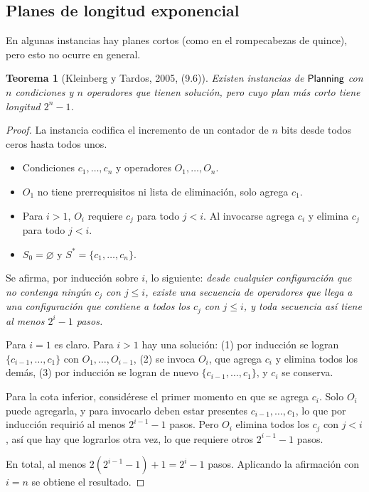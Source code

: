 \documentclass[11pt,letterpaper]{article}
\theoremstyle{plain}
\newtheorem{teorema}{Teorema}[section]
\theoremstyle{definition}
\theoremstyle{remark}
\newcommand{\vacio}{\varnothing}
\newcommand{\nombreMat}[1]{\ensuremath{\text{\fontencoding{OT1}\fontfamily{cmss}\upshape\selectfont #1}}}
\newcommand{\PLANNING}{\nombreMat{Planning}}
\begin{document}
\subsection{Planes de longitud exponencial}

En algunas instancias hay planes cortos (como en el
rompecabezas de quince), pero esto no ocurre en general.

\begin{teorema}[Kleinberg y Tardos, 2005, (9.6)]
\label{teo:96}
Existen instancias de \PLANNING{} con $n$ condiciones
y $n$ operadores que tienen solución, pero cuyo plan
más corto tiene longitud $2^{n}-1$.
\end{teorema}

\begin{proof}
La instancia codifica el incremento de un contador
de $n$ bits desde todos ceros hasta todos unos.

\begin{itemize}[leftmargin=1.5em,itemsep=1pt]
\item Condiciones $c_1,\dots,c_n$ y operadores
$O_1,\dots,O_n$.

\item $O_1$ no tiene prerrequisitos ni lista de
eliminación, solo agrega $c_1$.

\item Para $i>1$, $O_i$ requiere $c_j$ para todo
$j<i$. Al invocarse agrega $c_i$ y elimina
$c_j$ para todo $j<i$.

\item $S_0=\vacio$ y $S^{*}=\{c_1,\dots,c_n\}$.
\end{itemize}

Se afirma, por inducción sobre $i$, lo siguiente:
\emph{desde cualquier configuración que no contenga
ningún $c_j$ con $j\le i$, existe una secuencia
de operadores que llega a una configuración que
contiene a todos los $c_j$ con $j\le i$, y toda
secuencia así tiene al menos $2^{i}-1$ pasos.}

Para $i=1$ es claro. Para $i>1$ hay una solución:
(1) por inducción se logran
$\{c_{i-1},\dots,c_1\}$ con
$O_1,\dots,O_{i-1}$,
(2) se invoca $O_i$, que agrega $c_i$ y elimina
todos los demás,
(3) por inducción se logran de nuevo
$\{c_{i-1},\dots,c_1\}$, y $c_i$ se conserva.

Para la cota inferior, considérese el primer momento
en que se agrega $c_i$. Solo $O_i$ puede agregarla,
y para invocarlo deben estar presentes
$c_{i-1},\dots,c_1$, lo que por inducción requirió
al menos $2^{i-1}-1$ pasos. Pero $O_i$ elimina todos
los $c_j$ con $j<i$, así que hay que lograrlos otra vez,
lo que requiere otros $2^{i-1}-1$ pasos.

En total, al menos
$2(2^{i-1}-1)+1=2^{i}-1$ pasos.
Aplicando la afirmación con $i=n$ se obtiene
el resultado.
\end{proof}
\end{document}
